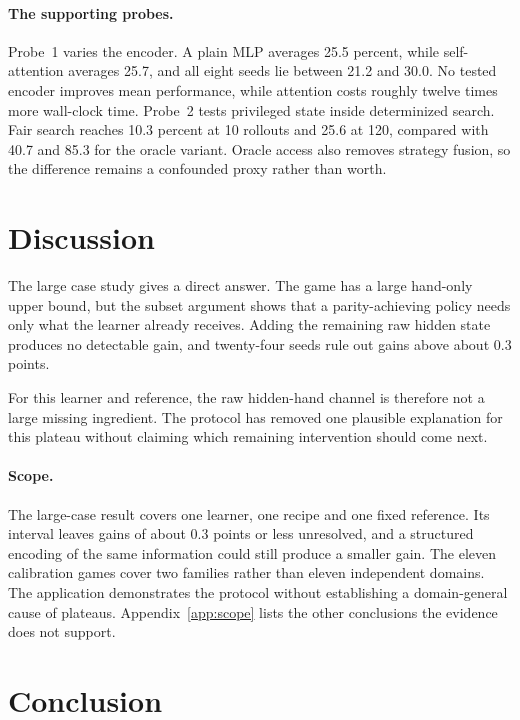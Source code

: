 \documentclass{article}
\begin{document}
\FloatBarrier
\paragraph{The supporting probes.} Probe~1 varies the encoder. A plain MLP averages 25.5 percent, while self-attention averages 25.7, and all eight seeds lie between 21.2 and 30.0. No tested encoder improves mean performance, while attention costs roughly twelve times more wall-clock time. Probe~2 tests privileged state inside determinized search. Fair search reaches 10.3 percent at 10 rollouts and 25.6 at 120, compared with 40.7 and 85.3 for the oracle variant. Oracle access also removes strategy fusion, so the difference remains a confounded proxy rather than worth.

\FloatBarrier
\section{Discussion}

The large case study gives a direct answer. The game has a large hand-only upper bound, but the subset argument shows that a parity-achieving policy needs only what the learner already receives. Adding the remaining raw hidden state produces no detectable gain, and twenty-four seeds rule out gains above about $0.3$ points.

For this learner and reference, the raw hidden-hand channel is therefore not a large missing ingredient. The protocol has removed one plausible explanation for this plateau without claiming which remaining intervention should come next.

\paragraph{Scope.} The large-case result covers one learner, one recipe and one fixed reference. Its interval leaves gains of about $0.3$ points or less unresolved, and a structured encoding of the same information could still produce a smaller gain. The eleven calibration games cover two families rather than eleven independent domains. The application demonstrates the protocol without establishing a domain-general cause of plateaus. Appendix~\ref{app:scope} lists the other conclusions the evidence does not support.

\section{Conclusion}
\end{document}
